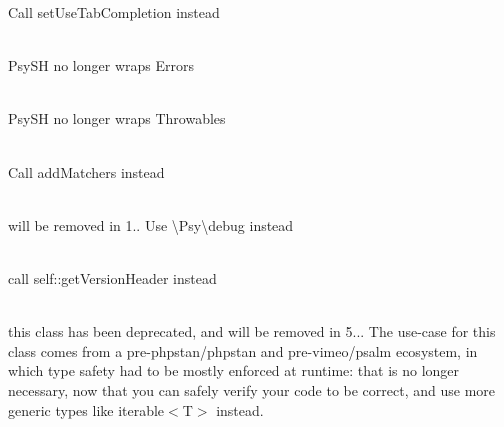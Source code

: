 \begin{DoxyRefList}
\label{deprecated__deprecated000253}%
%
Call {\ttfamily set\+Use\+Tab\+Completion} instead 
\item[Member \doxylink{class_psy_1_1_exception_1_1_error_exception_a24924b09cde243ff1afff6539086a6dd}{Psy\textbackslash{}Exception\textbackslash{}Error\+Exception\+::from\+Error} (\textbackslash{}\doxylink{class_php_parser_1_1_error}{Error} \$e)]\hfill \\
\label{deprecated__deprecated000260}%
%
Psy\+SH no longer wraps Errors 
\item[Member \doxylink{class_psy_1_1_exception_1_1_throw_up_exception_a54d0e9b6a7274324d525b8a80497bf31}{Psy\textbackslash{}Exception\textbackslash{}Throw\+Up\+Exception\+::from\+Throwable} (\$throwable)]\hfill \\
\label{deprecated__deprecated000261}%
%
Psy\+SH no longer wraps Throwables 
\item[Member \doxylink{class_psy_1_1_shell_a3ceed99461a05abf5b8553e70e591fb9}{Psy\textbackslash{}Shell\+::add\+Tab\+Completion\+Matchers} (array \$matchers)]\hfill \\
\label{deprecated__deprecated000263}%
%
Call {\ttfamily add\+Matchers} instead 
\item[Member \doxylink{class_psy_1_1_shell_a3904624f77fc6e58dc264215db3cc4ed}{Psy\textbackslash{}Shell\+::debug} (array \$vars=\mbox{[}\mbox{]}, \$bind\+To=null)]\hfill \\
\label{deprecated__deprecated000262}%
%
will be removed in 1.. Use \textbackslash{}\+Psy\textbackslash{}debug instead 
\item[Member \doxylink{class_psy_1_1_shell_ae965659abddec9029e9bfef7f91f3ad4}{Psy\textbackslash{}Shell\+::get\+Version} ()]\hfill \\
\label{deprecated__deprecated000264}%
%
call self\+::get\+Version\+Header instead  
\item[Class \doxylink{class_ramsey_1_1_uuid_1_1_builder_1_1_builder_collection}{Ramsey\textbackslash{}Uuid\textbackslash{}Builder\textbackslash{}Builder\+Collection} ]\hfill \\
\label{deprecated__deprecated000265}%
%
this class has been deprecated, and will be removed in 5... The use-\/case for this class comes from a pre-\/{\ttfamily phpstan/phpstan} and pre-\/{\ttfamily vimeo/psalm} ecosystem, in which type safety had to be mostly enforced at runtime\+: that is no longer necessary, now that you can safely verify your code to be correct, and use more generic types like {\ttfamily iterable\texorpdfstring{$<$}{<}T\texorpdfstring{$>$}{>}} instead. 

\end{DoxyRefList}
